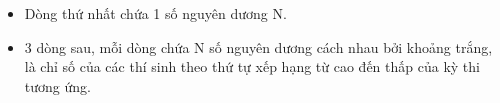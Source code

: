 \begin{itemize}
	\item     Dòng thứ nhất chứa 1 số nguyên dương N.   
	\item     3 dòng sau, mỗi dòng chứa N số nguyên dương cách nhau bởi khoảng trắng, là chỉ số của các thí sinh theo thứ tự xếp hạng từ cao đến thấp của kỳ   thi tương ứng.   
\end{itemize}

\